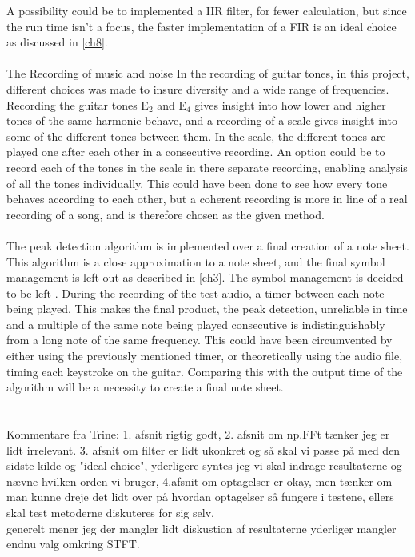 A possibility could be to implemented a IIR filter, for fewer calculation, but since the run time isn't a focus, the faster implementation of a FIR is an ideal choice as discussed in \ref{ch8}.
\\\\
The Recording of music and noise 
In the recording of guitar tones, in this project, different choices was made to insure diversity and a wide range of frequencies.
Recording the guitar tones E$_2$ and E$_4$ gives insight into how lower and higher tones of the same harmonic behave, and a recording of a scale gives insight into some of the different tones between them.
In the scale, the different tones are played one after each other in a consecutive recording. 
An option could be to record each of the tones in the scale in there separate recording, enabling analysis of all the tones individually.
This could have been done to see how every tone behaves according to each other, but a coherent recording is more in line of a real recording of a song, and is therefore chosen as the given method.
\\\\
The peak detection algorithm is implemented over a final creation of a note sheet.
This algorithm is a close approximation to a note sheet, and the final symbol management is left out as described in \ref{ch3}.
The symbol management is decided to be left .
During the recording of the test audio, a timer between each note being played.
This makes the final product, the peak detection, unreliable in time and a multiple of the same note being played consecutive is indistinguishably from a long note of the same frequency.
This could have been circumvented by either using the previously mentioned timer, or theoretically using the audio file, timing each keystroke on the guitar.
Comparing this with the output time of the algorithm will be a necessity to create a final note sheet.\\
\\
\\

Kommentare fra Trine: 1. afsnit rigtig godt, 2. afsnit om np.FFt tænker jeg er lidt irrelevant. 3. afsnit om filter er lidt ukonkret og så skal vi passe på med den sidste kilde og "ideal choice", yderligere syntes jeg vi skal indrage resultaterne og nævne hvilken orden vi bruger, 4.afsnit om optagelser er okay, men tænker om man kunne dreje det lidt over på hvordan optagelser så fungere i testene, ellers skal test metoderne diskuteres for sig selv. \\
generelt mener jeg der mangler lidt diskustion af resultaterne yderliger mangler endnu valg omkring STFT. 
 



